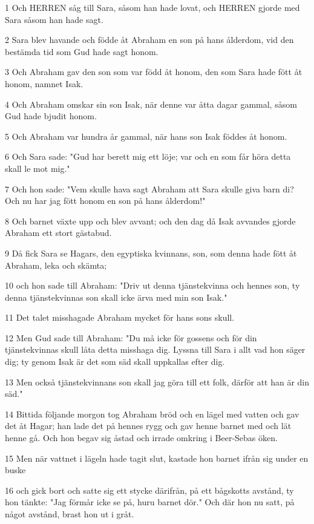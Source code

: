 \par 1 Och HERREN såg till Sara, såsom han hade lovat, och HERREN gjorde med Sara såsom han hade sagt.
\par 2 Sara blev havande och födde åt Abraham en son på hans ålderdom, vid den bestämda tid som Gud hade sagt honom.
\par 3 Och Abraham gav den son som var född åt honom, den som Sara hade fött åt honom, namnet Isak.
\par 4 Och Abraham omskar sin son Isak, när denne var åtta dagar gammal, såsom Gud hade bjudit honom.
\par 5 Och Abraham var hundra år gammal, när hans son Isak föddes åt honom.
\par 6 Och Sara sade: "Gud har berett mig ett löje; var och en som får höra detta skall le mot mig."
\par 7 Och hon sade: "Vem skulle hava sagt Abraham att Sara skulle giva barn di? Och nu har jag fött honom en son på hans ålderdom!"
\par 8 Och barnet växte upp och blev avvant; och den dag då Isak avvandes gjorde Abraham ett stort gästabud.
\par 9 Då fick Sara se Hagars, den egyptiska kvinnans, son, som denna hade fött åt Abraham, leka och skämta;
\par 10 och hon sade till Abraham: "Driv ut denna tjänstekvinna och hennes son, ty denna tjänstekvinnas son skall icke ärva med min son Isak."
\par 11 Det talet misshagade Abraham mycket för hans sons skull.
\par 12 Men Gud sade till Abraham: "Du må icke för gossens och för din tjänstekvinnas skull låta detta misshaga dig. Lyssna till Sara i allt vad hon säger dig; ty genom Isak är det som säd skall uppkallas efter dig.
\par 13 Men också tjänstekvinnans son skall jag göra till ett folk, därför att han är din säd."
\par 14 Bittida följande morgon tog Abraham bröd och en lägel med vatten och gav det åt Hagar; han lade det på hennes rygg och gav henne barnet med och lät henne gå. Och hon begav sig åstad och irrade omkring i Beer-Sebas öken.
\par 15 Men när vattnet i lägeln hade tagit slut, kastade hon barnet ifrån sig under en buske
\par 16 och gick bort och satte sig ett stycke därifrån, på ett bågskotts avstånd, ty hon tänkte: "Jag förmår icke se på, huru barnet dör." Och där hon nu satt, på något avstånd, brast hon ut i gråt.
